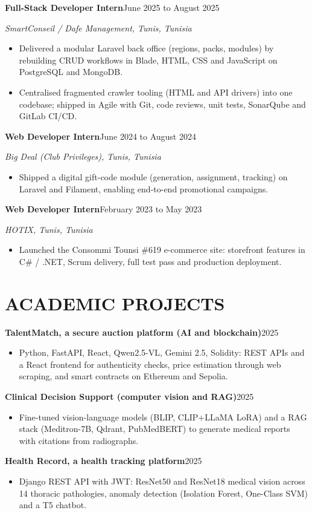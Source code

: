 \documentclass[10pt,a4paper]{article}
\newcommand{\job}[3]{%
 \par\noindent\textbf{\color{primary}#1}\hfill{\color{muted}\small #2}\par\vspace{0.4pt}%
 {\noindent\color{accent}\textit{\small #3}}\par\vspace{1pt}%
 \begin{itemize}[leftmargin=0.85em, itemsep=0.8pt, topsep=0.4pt, parsep=0pt, partopsep=0pt]
}
\newcommand{\proj}[2]{%
 \par\noindent\textbf{\color{primary}#1}\hfill{\color{muted}\small #2}\par\vspace{0.4pt}%
 \begin{itemize}[leftmargin=0.85em, itemsep=0.8pt, topsep=0.4pt, parsep=0pt, partopsep=0pt]
}
\begin{document}
\job{Full-Stack Developer Intern}{June 2025 to August 2025}{SmartConseil / Dafe Management, Tunis, Tunisia}
 \item Delivered a modular Laravel back office (regions, packs, modules) by rebuilding CRUD workflows in Blade, HTML, CSS and JavaScript on PostgreSQL and MongoDB.
 \item Centralised fragmented crawler tooling (HTML and API drivers) into one codebase; shipped in Agile with Git, code reviews, unit tests, SonarQube and GitLab CI/CD.
\end{itemize}

\job{Web Developer Intern}{June 2024 to August 2024}{Big Deal (Club Privileges), Tunis, Tunisia}
 \item Shipped a digital gift-code module (generation, assignment, tracking) on Laravel and Filament, enabling end-to-end promotional campaigns.
\end{itemize}

\job{Web Developer Intern}{February 2023 to May 2023}{HOTIX, Tunis, Tunisia}
 \item Launched the Consommi Tounsi \#619 e-commerce site: storefront features in C\# / .NET, Scrum delivery, full test pass and production deployment.
\end{itemize}

\section{ACADEMIC PROJECTS}

\proj{TalentMatch, a secure auction platform (AI and blockchain)}{2025}
 \item Python, FastAPI, React, Qwen2.5-VL, Gemini 2.5, Solidity: REST APIs and a React frontend for authenticity checks, price estimation through web scraping, and smart contracts on Ethereum and Sepolia.
\end{itemize}

\proj{Clinical Decision Support (computer vision and RAG)}{2025}
 \item Fine-tuned vision-language models (BLIP, CLIP+LLaMA LoRA) and a RAG stack (Meditron-7B, Qdrant, PubMedBERT) to generate medical reports with citations from radiographs.
\end{itemize}

\proj{Health Record, a health tracking platform}{2025}
 \item Django REST API with JWT: ResNet50 and ResNet18 medical vision across 14 thoracic pathologies, anomaly detection (Isolation Forest, One-Class SVM) and a T5 chatbot.
\end{itemize}
\end{document}
